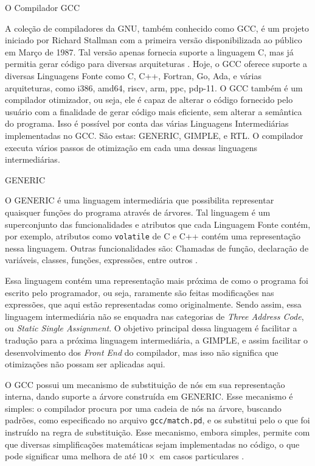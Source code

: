 \begin{section}{O Compilador GCC}

A coleção de compiladores da GNU, também conhecido como GCC, é um projeto
iniciado por Richard Stallman com a primeira versão disponibilizada ao público
em Março de 1987. Tal versão apenas fornecia suporte a linguagem C, mas já permitia
    gerar código para diversas arquiteturas \citep{gcc_first_ver}.
Hoje, o GCC oferece suporte a diversas Linguagens Fonte como C, C++, Fortran, Go, Ada,
e várias arquiteturas, como i386, amd64, riscv, arm, ppc, pdp-11. O GCC também
é um compilador otimizador, ou seja, ele é capaz de alterar o código fornecido
pelo usuário com a finalidade de gerar código mais eficiente, sem alterar a semântica do programa. Isso é
possível por conta das várias Linguagens Intermediárias implementadas no
GCC. São estas: GENERIC, GIMPLE, e RTL. O compilador executa vários
passos de otimização em cada uma dessas linguagens intermediárias.

\begin{subsection}{GENERIC}

    O GENERIC é uma linguagem intermediária que possibilita representar quaisquer
funções do programa através de árvores. Tal linguagem é um superconjunto
das funcionalidades e atributos que cada Linguagem Fonte contém, por exemplo, atributos
como \texttt{volatile} de C e C++ contém uma representação nessa linguagem.
Outras funcionalidades são: Chamadas de função, declaração de variáveis, classes,
funções, expressões, entre outros \citep{generic}.

    Essa linguagem contém uma representação mais próxima de como o programa foi
escrito pelo programador, ou seja, raramente são feitas modificações nas expressões,
que aqui estão representadas como originalmente. Sendo assim, essa linguagem
intermediária não se enquadra nas categorias de \textit{Three Address Code},
ou \textit{Static Single Assignment}. O objetivo principal dessa linguagem
é facilitar a tradução para a próxima linguagem intermediária, a GIMPLE, e assim
facilitar o desenvolvimento dos \textit{Front End} do compilador, mas isso não
significa que otimizações não possam ser aplicadas aqui.

    O GCC possui um mecanismo de substituição de nós em sua representação
interna, dando suporte a árvore construída em GENERIC. Esse mecanismo é simples: o
compilador procura por uma cadeia de nós na árvore, buscando padrões,
como especificado no arquivo \texttt{gcc/match.pd}, e os substitui pelo o que
foi instruído na regra de substituição. Esse mecanismo, embora simples, permite
com que diversas simplificações matemáticas sejam implementadas no código, o
que pode significar uma melhora de até $10\times$ em casos particulares
\citep{sinatan}.


\end{subsection}
\end{section}
